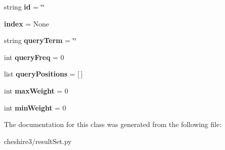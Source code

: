 \begin{DoxyCompactItemize}
\item 
\hypertarget{classcheshire3_1_1result_set_1_1_bitmap_result_set_a7a984124de0e24ad818a3826cbf6c2d5}{string {\bfseries id} = \char`\"{}\char`\"{}}\label{classcheshire3_1_1result_set_1_1_bitmap_result_set_a7a984124de0e24ad818a3826cbf6c2d5}

\item 
\hypertarget{classcheshire3_1_1result_set_1_1_bitmap_result_set_a9ae8c7d660a991cf7cb18157a41e8c95}{{\bfseries index} = None}\label{classcheshire3_1_1result_set_1_1_bitmap_result_set_a9ae8c7d660a991cf7cb18157a41e8c95}

\item 
\hypertarget{classcheshire3_1_1result_set_1_1_bitmap_result_set_a35e304501ee75776a33472cf02588efa}{string {\bfseries query\-Term} = \char`\"{}\char`\"{}}\label{classcheshire3_1_1result_set_1_1_bitmap_result_set_a35e304501ee75776a33472cf02588efa}

\item 
\hypertarget{classcheshire3_1_1result_set_1_1_bitmap_result_set_a5b08456850e37aae6eacd6d5f8a9b299}{int {\bfseries query\-Freq} = 0}\label{classcheshire3_1_1result_set_1_1_bitmap_result_set_a5b08456850e37aae6eacd6d5f8a9b299}

\item 
\hypertarget{classcheshire3_1_1result_set_1_1_bitmap_result_set_a0513ed9b6af673d77e5687b920ec426a}{list {\bfseries query\-Positions} = \mbox{[}$\,$\mbox{]}}\label{classcheshire3_1_1result_set_1_1_bitmap_result_set_a0513ed9b6af673d77e5687b920ec426a}

\item 
\hypertarget{classcheshire3_1_1result_set_1_1_bitmap_result_set_a60846df48a122fbab972a84e7c13dce7}{int {\bfseries max\-Weight} = 0}\label{classcheshire3_1_1result_set_1_1_bitmap_result_set_a60846df48a122fbab972a84e7c13dce7}

\item 
\hypertarget{classcheshire3_1_1result_set_1_1_bitmap_result_set_a0486319e00b9675696255c7058fe9a2e}{int {\bfseries min\-Weight} = 0}\label{classcheshire3_1_1result_set_1_1_bitmap_result_set_a0486319e00b9675696255c7058fe9a2e}

\end{DoxyCompactItemize}


The documentation for this class was generated from the following file\-:\begin{DoxyCompactItemize}
\item 
cheshire3/result\-Set.\-py\end{DoxyCompactItemize}

